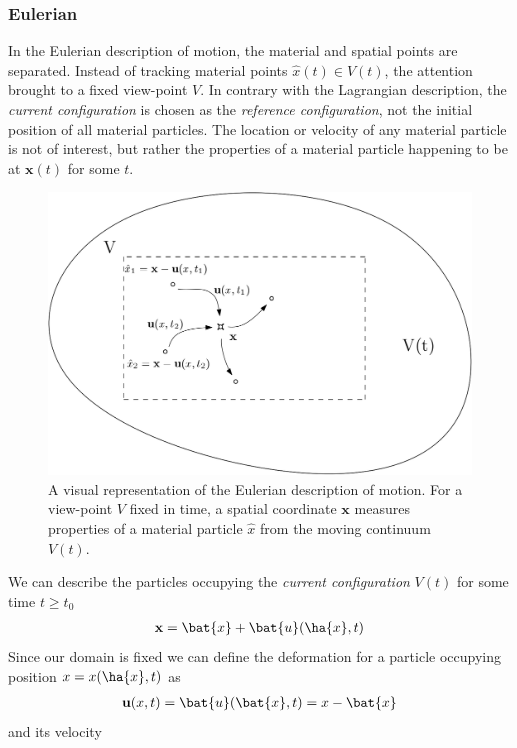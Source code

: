 \subsubsection*{Eulerian}
In the Eulerian description of motion, the material and spatial points are separated. Instead of tracking material points $\hat{x}(t) \in V(t)$, the attention brought to a fixed view-point $V$. In contrary with the Lagrangian description, the \textit{current configuration} is chosen as the \textit{reference configuration}, not the initial position of all material particles. The location or velocity of any material particle is not of interest, but rather the properties of a material particle happening to be at  $\mathbf{x}(t)$ for some $t$. 
\begin{figure}[h!]
  \centering
    \includegraphics[scale=0.3]{./Fig/eulerian.png}
      \caption{A visual representation of the Eulerian description of motion. For a  view-point  $V$ fixed in time, a spatial coordinate $\mathbf{x}$ measures properties of a material particle $\hat{x}$ from the moving continuum  $V(t)$.}
\end{figure} 
\newpage
We can describe the particles occupying the \textit{current configuration} $V(t)$ for some time $t \geq t_0$ 
\begin{align*}
\mathbf{x} = \bat{x} + \bat{u}(\ha{x}, t)       
\end{align*}
Since our domain is fixed we can define the deformation for a particle 
occupying position $x = x(\ha{x},t)$ as
\begin{align*}
\textbf{u}(x, t) = \bat{u}(\bat{x}, t) = x - \bat{x}    \\
\end{align*}
and its velocity
